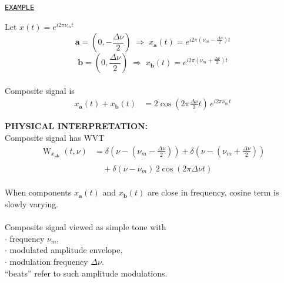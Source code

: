 \documentclass{slides}
\def\W{\operatorname{W}}
\def\half{{\scriptstyle \frac{1}{2}}}
\def\halfDnu{{\scriptstyle \frac{\Delta\nu}{2}}}
\def\a{\mathbf{a}}
\def\b{\mathbf{b}}
\begin{document}
\begin{slide}%
\begin{center}{\tt \underline{EXAMPLE}}\end{center}
Let %
$x(t) = e^{i2\pi\nu_m t}$
\[\a = (0,-\halfDnu)\; \Rightarrow\;
x_\a(t)=e^{i2\pi(\nu_m-\halfDnu)t}\]
\[
 \b = (0,\halfDnu) \;\Rightarrow \;x_\b(t)= e^{i2\pi(\nu_m+\halfDnu)t}
\]\\
Composite signal is 
\begin{align*}
x_\a(t) + x_\b(t) &= 2\cos(2\pi \halfDnu t)\, e^{i2\pi\nu_mt}
\end{align*}
\end{slide}
\begin{slide}
{\bf PHYSICAL INTERPRETATION:}\\
Composite signal has WVT 
\begin{align*}
 \W_{x_{\a \b}}(t,\nu)&=\delta(\nu-(\nu_m-\halfDnu))+\delta(\nu-(\nu_m+\halfDnu))\\
\\
&\quad +\delta(\nu-\nu_m)\,2\cos(2\pi \Delta\nu t)
\end{align*}\\
When components $x_\a(t)$ and $x_\b(t)$ are close in
frequency, %
cosine term is slowly varying. \\
\\
Composite signal %
viewed as simple tone with \\
$\cdot$ frequency $\nu_m$,\\
$\cdot$ modulated amplitude envelope, \\
$\cdot$ modulation frequency $\Delta\nu$.\\
``beats'' refer to such amplitude modulations. %
\end{slide}
\end{document}
